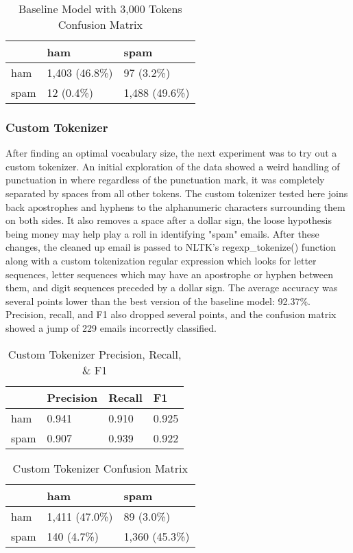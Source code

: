 \documentclass[a4paper]{article}
\begin{document}
	\begin{table}[H]
		\centering
		\caption{Baseline Model with 3,000 Tokens Confusion Matrix}
		\begin{tabular}{l|ll}
			& ham & spam \\
			\hline
			ham & 1,403 (46.8\%) & 97 (3.2\%) \\
			spam & 12 (0.4\%) & 1,488 (49.6\%)
		\end{tabular}
	\end{table}

	\subsubsection{Custom Tokenizer}
	
	After finding an optimal vocabulary size, the next experiment was to try out a custom tokenizer. An initial exploration of the data showed a weird handling of punctuation in where regardless of the punctuation mark, it was completely separated by spaces from all other tokens. The custom tokenizer tested here joins back apostrophes and hyphens to the alphanumeric characters surrounding them on both sides. It also removes a space after a dollar sign, the loose hypothesis being money may help play a roll in identifying "spam" emails. After these changes, the cleaned up email is passed to NLTK’s regexp\_tokenize() function along with a custom tokenization regular expression which looks for letter sequences, letter sequences which may have an apostrophe or hyphen between them, and digit sequences preceded by a dollar sign. The average accuracy was several points lower than the best version of the baseline model: 92.37\%. Precision, recall, and F1 also dropped several points, and the confusion matrix showed a jump of 229 emails incorrectly classified.
	
	\begin{table}[H]
		\centering
		\caption{Custom Tokenizer Precision, Recall, \& F1}
		\begin{tabular}{l|lll}
			& Precision & Recall & F1 \\
			\hline
			ham & 0.941 & 0.910 & 0.925 \\
			spam & 0.907 & 0.939 & 0.922
		\end{tabular}
	\end{table}
	
	\begin{table}[H]
		\centering
		\caption{Custom Tokenizer Confusion Matrix}
		\begin{tabular}{l|ll}
			& ham & spam \\
			\hline
			ham & 1,411 (47.0\%) & 89 (3.0\%) \\
			spam & 140 (4.7\%) & 1,360 (45.3\%)
		\end{tabular}
	\end{table}
	
\end{document}
